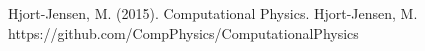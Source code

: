 \documentclass[twoside,twocolumn]{article}
\begin{document}

\begin{thebibliography}{99} %
Hjort-Jensen, M. (2015).
\newblock Computational Physics.
Hjort-Jensen, M.
\newblock https://github.com/CompPhysics/ComputationalPhysics

 
\end{thebibliography}

\end{document}
